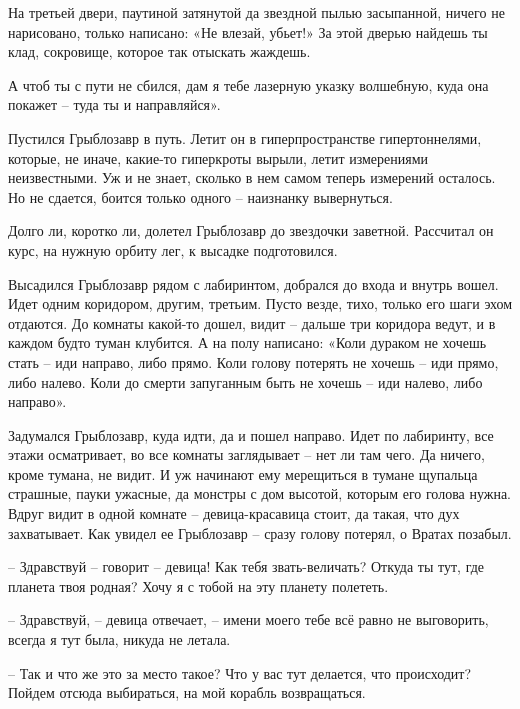 \documentclass[ebook,oneside,final,openright]{memoir}
\begin{document}
\par
На третьей двери, паутиной затянутой да звездной пылью засыпанной, ничего не нарисовано, только написано: «Не влезай, убьет!» За этой дверью найдешь ты клад, сокровище, которое так отыскать жаждешь.\par
\par
А чтоб ты с пути не сбился, дам я тебе лазерную указку волшебную, куда она покажет – туда ты и направляйся».\par
\par
Пустился Грыблозавр в путь. Летит он в гиперпространстве гипертоннелями, которые, не иначе, какие-то гиперкроты вырыли, летит измерениями неизвестными. Уж и не знает, сколько в нем самом теперь измерений осталось. Но не сдается, боится только одного – наизнанку вывернуться.\par
\par
Долго ли, коротко ли, долетел Грыблозавр до звездочки заветной. Рассчитал он курс, на нужную орбиту лег, к высадке подготовился.\par
\par
Высадился Грыблозавр рядом с лабиринтом, добрался до входа и внутрь вошел. Идет одним коридором, другим, третьим. Пусто везде, тихо, только его шаги эхом отдаются. До комнаты какой-то дошел, видит – дальше три коридора ведут, и в каждом будто туман клубится. А на полу написано: «Коли дураком не хочешь стать – иди направо, либо прямо. Коли голову потерять не хочешь – иди прямо, либо налево. Коли до смерти запуганным быть не хочешь – иди налево, либо направо».\par
\par
Задумался Грыблозавр, куда идти, да и пошел направо. Идет по лабиринту, все этажи осматривает, во все комнаты заглядывает – нет ли там чего. Да ничего, кроме тумана, не видит. И уж начинают ему мерещиться в тумане щупальца страшные, пауки ужасные, да монстры с дом высотой, которым его голова нужна. Вдруг видит в одной комнате – девица-красавица стоит, да такая, что дух захватывает. Как увидел ее Грыблозавр – сразу голову потерял, о Вратах позабыл.\par
\par
– Здравствуй – говорит – девица! Как тебя звать-величать? Откуда ты тут, где планета твоя родная? Хочу я с тобой на эту планету полететь.\par
– Здравствуй, – девица отвечает, – имени моего тебе всё равно не выговорить, всегда я тут была, никуда не летала.\par
– Так и что же это за место такое? Что у вас тут делается, что происходит? Пойдем отсюда выбираться, на мой корабль возвращаться.\par
\end{document}

